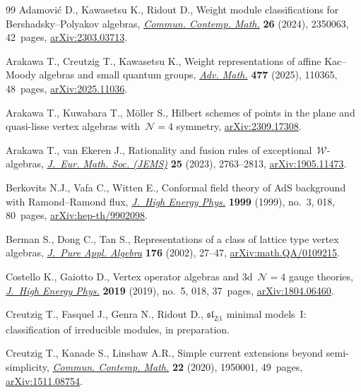 \begin{thebibliography}{99}
Adamovi\'c D., Kawasetsu K., Ridout D., Weight module classifications for
 {B}ershadsky--{P}olyakov algebras,
 \href{https://doi.org/10.1142/S0219199723500633}{\textit{Commun. Contemp.
 Math.}} \textbf{26} (2024), 2350063, 42~pages,
 \href{http://arxiv.org/abs/2303.03713}{arXiv:2303.03713}.

Arakawa T., Creutzig T., Kawasetsu K., Weight representations of affine
 {K}ac--{M}oody algebras and small quantum groups,
 \href{https://doi.org/10.1016/j.aim.2025.110365}{\textit{Adv. Math.}}
 \textbf{477} (2025), 110365, 48~pages,
 \href{http://arxiv.org/abs/2025.11036}{arXiv:2025.11036}.

Arakawa T., Kuwabara T., M\"oller S., Hilbert schemes of points in the plane
 and quasi-lisse vertex algebras with~{$\mathcal{N}=4$} symmetry,
 \href{http://arxiv.org/abs/2309.17308}{arXiv:2309.17308}.

Arakawa T., van Ekeren J., Rationality and fusion rules of
 exceptional~{$\mathcal {W}$}-algebras,
 \href{https://doi.org/10.4171/jems/1250}{\textit{J.~Eur. Math. Soc. (JEMS)}}
 \textbf{25} (2023), 2763--2813,
 \href{http://arxiv.org/abs/1905.11473}{arXiv:1905.11473}.

Berkovits N.J., Vafa C., Witten E., Conformal field theory of {A}d{S}
 background with {R}amond--{R}amond flux,
 \href{https://doi.org/10.1088/1126-6708/1999/03/018}{\textit{J.~High Energy
 Phys.}} \textbf{1999} (1999), no.~3, 018, 80~pages,
 \href{http://arxiv.org/abs/hep-th/9902098}{arXiv:hep-th/9902098}.

Berman S., Dong C., Tan S., Representations of a class of lattice type vertex
 algebras,
 \href{https://doi.org/10.1016/S0022-4049(02)00053-1}{\textit{J.~Pure Appl.
 Algebra}} \textbf{176} (2002), 27--47,
 \href{http://arxiv.org/abs/math.QA/0109215}{arXiv:math.QA/0109215}.

Costello K., Gaiotto D., Vertex operator algebras and 3d~{$\mathcal N=4$}
 gauge theories,
 \href{https://doi.org/10.1007/jhep05(2019)018}{\textit{J.~High Energy Phys.}}
 \textbf{2019} (2019), no.~5, 018, 37~pages,
 \href{http://arxiv.org/abs/1804.06460}{arXiv:1804.06460}.

Creutzig T., Fasquel J., Genra N., Ridout D., $\mathfrak{sl}_{2\vert1}$ minimal
 models~{I}: classification of irreducible modules, {i}n preparation.

Creutzig T., Kanade S., Linshaw A.R., Simple current extensions beyond
 semi-simplicity,
 \href{https://doi.org/10.1142/S0219199719500019}{\textit{Commun. Contemp.
 Math.}} \textbf{22} (2020), 1950001, 49~pages,
 \href{http://arxiv.org/abs/1511.08754}{arXiv:1511.08754}.


\end{thebibliography}
